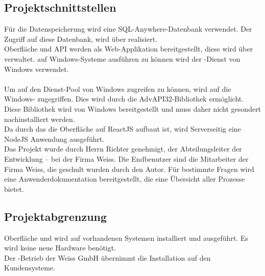 \subsection{Projektschnittstellen} 
\label{sec:Projektschnittstellen}

Für die Datenspeicherung wird eine SQL-Anywhere-Datenbank verwendet. Der Zugriff auf diese Datenbank, wird über  realisiert. \\
Oberfläche und API werden als Web-Applikation bereitgestellt, diese wird über  verwaltet.  auf Windows-Systeme ausführen zu können wird der -Dienst von Windows verwendet. \\
\\
Um auf den Dienst-Pool von Windows zugreifen zu können, wird auf die Windows- zugegriffen. Dies wird durch die AdvAPI32-Bibliothek ermöglicht.
Diese Bibliothek wird von Windows bereitgestellt und muss daher nicht gesondert nachinstalliert werden. \\
Da durch das die Oberfläche auf ReactJS aufbaut ist, wird Serverseitig eine NodeJS Anwendung ausgeführt. \\
Das Projekt wurde durch Herrn Richter genehmigt, der Abteilungsleiter der Entwicklung – bei der Firma Weiss. Die Endbenutzer sind die Mitarbeiter der Firma Weiss, die geschult wurden durch den Autor. Für bestimmte Fragen wird eine Anwenderdokumentation bereitgestellt, die eine Übersicht aller Prozesse bietet. 

\subsection{Projektabgrenzung} 
\label{sec:Projektabgrenzung}

Oberfläche und  wird auf vorhandenen Systemen installiert und ausgeführt. Es wird keine neue Hardware benötigt.\\
Der -Betrieb der Weiss GmbH übernimmt die Installation auf den Kundensysteme.

